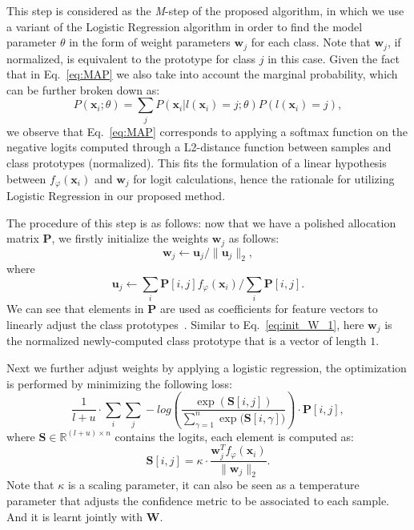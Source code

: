\documentclass[review]{elsarticle}
\begin{document}
This step is considered as the \emph{M}-step of the proposed algorithm, in which we use a variant of the Logistic Regression algorithm in order to find the model parameter $\theta$ in the form of weight parameters $\mathbf{w}_j$ for each class. Note that $\mathbf{w}_j$, if normalized, is equivalent to the prototype for class $j$ in this case. Given the fact that in Eq.~\ref{eq:MAP} we also take into account the marginal probability, which can be further broken down as:
\begin{equation}
P(\mathbf{x}_i;\theta) = \sum_j P(\mathbf{x}_i | l(\mathbf{x}_i)=j;\theta)P(l(\mathbf{x}_i)=j),
\label{eq:margin}
\end{equation}
we observe that Eq.~\ref{eq:MAP} corresponds to applying a softmax function on the negative logits computed through a L2-distance function between samples and class prototypes (normalized). This fits the formulation of a linear hypothesis between $f_\varphi(\mathbf{x}_i)$ and $\mathbf{w}_j$ for logit calculations, hence the rationale for utilizing Logistic Regression in our proposed method.    

The procedure of this step is as follows: now that we have a polished allocation matrix $\mathbf{P}$, we firstly initialize the weights $\mathbf{w}_j$ as follows:
\begin{equation}
\mathbf{w}_j \leftarrow \mathbf{u}_j / \|\mathbf{u}_j\|_2,
\label{eq:init_W_2}
\end{equation}
where 
\begin{equation}
\mathbf{u}_j \leftarrow \sum_{i} \mathbf{P}[i,j]f_\varphi(\mathbf{x}_i) / \sum_{i}\mathbf{P}[i,j].
\label{eq:center_update}
\end{equation}
We can see that elements in $\mathbf{P}$ are used as coefficients for feature vectors to linearly adjust the class prototypes~\cite{hu2021leveraging}. Similar to Eq.~\ref{eq:init_W_1}, here $\mathbf{w}_j$ is the normalized newly-computed class prototype that is a vector of length $1$. 

Next we further adjust weights by applying a logistic regression, the optimization is performed by minimizing the following loss:
\begin{equation}
    \frac{1}{l+u}\cdot\sum_i\sum_j -log(\frac{\exp{(\mathbf{S}[i,j])}}{\sum_{\gamma=1}^{n} \exp{(\mathbf{S}[i,\gamma]})})\cdot\mathbf{P}[i,j],
\label{eq:LR}
\end{equation}
where $\mathbf{S}\in\mathbb{R}^{(l+u)\times n}$ contains the logits, each element is computed as:
\begin{equation}
\mathbf{S}[i,j] = \kappa\cdot\frac{\mathbf{w}_{j}^{T} f_\varphi(\mathbf{x}_i)}{\|\mathbf{w}_j\|_2}.
\label{eq:logits}
\end{equation}
Note that $\kappa$ is a scaling parameter, it can also be seen as a temperature parameter that adjusts the confidence metric to be associated to each sample. And it is learnt jointly with $\mathbf{W}$.
\end{document}
